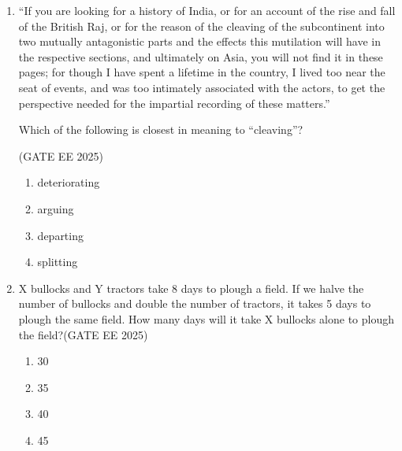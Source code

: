 \documentclass[journal,12pt,onecolumn]{IEEEtran}
\theoremstyle{remark}
\begin{document}
\begin{enumerate}
\hfill(GATE EE 2025)

\begin{multicols}{2}
\begin{enumerate}
\item 0
\item 1
\item 2
\item Cannot be determined
\end{enumerate}
\end{multicols}

\item ``If you are looking for a history of India, or for an account of the rise and fall of the British Raj, or for the reason of the cleaving of the subcontinent into two mutually antagonistic parts and the effects this mutilation will have in the respective sections, and ultimately on Asia, you will not find it in these pages; for though I have spent a lifetime in the country, I lived too near the seat of events, and was too intimately associated with the actors, to get the perspective needed for the impartial recording of these matters.''

Which of the following is closest in meaning to ``cleaving''?

\hfill(GATE EE 2025)

\begin{multicols}{4}
\begin{enumerate}
\item deteriorating
\item arguing
\item departing
\item splitting
\end{enumerate}
\end{multicols}

\item X bullocks and Y tractors take 8 days to plough a field. If we halve the number of bullocks and double the number of tractors, it takes 5 days to plough the same field. How many days will it take X bullocks alone to plough the field?\hfill(GATE EE 2025)

\begin{multicols}{4}
\begin{enumerate}
\item 30
\item 35
\item 40
\item 45
\end{enumerate}
\end{multicols}


\end{enumerate}
\end{document}
